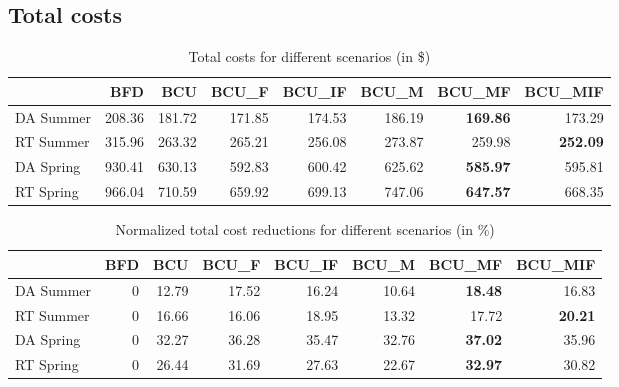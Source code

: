 \subsection{Total costs}


\begin{table}[ht]
\centering

\begin{tabular}{lrrrrrrr}
\toprule
{} &     BFD &     BCU &   BCU\_F &  BCU\_IF &   BCU\_M &  BCU\_MF &  BCU\_MIF \\
\midrule
DA Summer &  208.36 &  181.72 &  171.85 &  174.53 &  186.19 &  \textbf{169.86} &   173.29 \\
RT Summer &  315.96 &  263.32 &  265.21 &  256.08 &  273.87 &  259.98 &   \textbf{252.09} \\
DA Spring &  930.41 &  630.13 &  592.83 &  600.42 &  625.62 &  \textbf{585.97} &   595.81 \\
RT Spring &  966.04 &  710.59 &  659.92 &  699.13 &  747.06 &  \textbf{647.57} &   668.35 \\
\bottomrule
\end{tabular}
\caption{Total costs for different scenarios (in \$)}
\end{table}

\begin{table}[ht]
\centering
\begin{tabular}{lrrrrrrr}
\toprule
{} &  BFD &    BCU &  BCU\_F &  BCU\_IF &  BCU\_M &  BCU\_MF &  BCU\_MIF \\
\midrule
DA Summer &    0 &  12.79 &  17.52 &   16.24 &  10.64 &   \textbf{18.48} &    16.83 \\
RT Summer &    0 &  16.66 &  16.06 &   18.95 &  13.32 &   17.72 &    \textbf{20.21} \\
DA Spring &    0 &  32.27 &  36.28 &   35.47 &  32.76 &   \textbf{37.02} &    35.96 \\
RT Spring &    0 &  26.44 &  31.69 &   27.63 &  22.67 &   \textbf{32.97} &    30.82 \\
\bottomrule
\end{tabular}
\caption{Normalized total cost reductions for different scenarios (in \%)}
\end{table}





